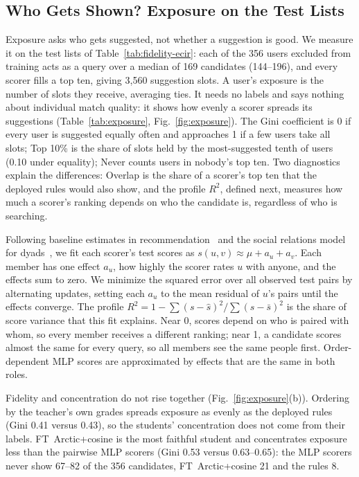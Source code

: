 \documentclass[runningheads,a4paper]{llncs}
\newcommand{\model}[1]{{\hyphenpenalty=10000 \exhyphenpenalty=10000 \textsf{#1}}}
\begin{document}
\subsection{Who Gets Shown? Exposure on the Test Lists}
\label{sec:exposure}
Exposure asks who gets suggested, not whether a suggestion is good. We measure
it on the test lists of Table~\ref{tab:fidelity-ecir}: each of the 356 users
excluded from training acts as a query over a median of 169 candidates
(144--196), and every scorer fills a top ten, giving 3,560 suggestion slots. A
user's exposure is the number of slots they receive, averaging ties. It needs no
labels and says nothing about individual match quality: it shows how evenly a
scorer spreads its suggestions (Table~\ref{tab:exposure}, Fig.~\ref{fig:exposure}).
The Gini coefficient is 0 if every user is suggested equally often and
approaches 1 if a few users take all slots; Top 10\% is the share of slots held
by the most-suggested tenth of users (0.10 under equality); Never counts users
in nobody's top ten. Two diagnostics explain the differences: Overlap is the
share of a scorer's top ten that the deployed rules would also show, and the
profile $R^2$, defined next, measures how much a scorer's ranking depends on who
the candidate is, regardless of who is searching.

Following baseline estimates in recommendation~\cite{koren2008factorization}
and the social relations model for dyads~\cite{kenny1984social}, we fit each
scorer's test scores as $s(u,v)\approx\mu+a_u+a_v$. Each member has one effect
$a_u$, how highly the scorer rates $u$ with anyone, and the effects sum to zero.
We minimize the squared error over all observed test pairs by alternating
updates, setting each $a_u$ to the mean residual of $u$'s pairs until the effects
converge. The profile $R^2=1-\sum(s-\hat{s})^2/\sum(s-\bar{s})^2$ is the share of
score variance that this fit explains. Near 0, scores depend on who is paired
with whom, so every member receives a different ranking; near 1, a candidate
scores almost the same for every query, so all members see the same people
first. Order-dependent MLP scores are approximated by effects that are the same in both roles.




Fidelity and concentration do not rise together (Fig.~\ref{fig:exposure}(b)).
Ordering by the teacher's own grades spreads exposure as evenly as the deployed rules
(Gini 0.41 versus 0.43), so the students' concentration does not come from their
labels. \model{FT~Arctic+cosine} is the most faithful student and
concentrates exposure less than the pairwise MLP scorers (Gini 0.53 versus 0.63--0.65): the MLP scorers never show
67--82 of the 356 candidates, \model{FT~Arctic+cosine} 21 and the rules 8.
\end{document}
